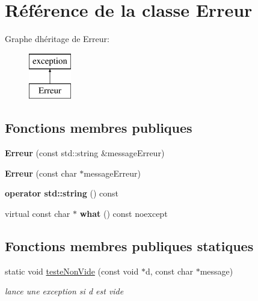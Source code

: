 \hypertarget{class_erreur}{}\section{Référence de la classe Erreur}
\label{class_erreur}
Graphe d\textquotesingle{}héritage de Erreur\+:\begin{figure}[H]
\begin{center}
\leavevmode
\includegraphics[height=2.000000cm]{class_erreur}
\end{center}
\end{figure}
\subsection*{Fonctions membres publiques}
\begin{DoxyCompactItemize}
\item 
\mbox{\label{class_erreur_a73d8d3c713bc18afd6a38cf337dfbb40}} 
{\bfseries Erreur} (const std\+::string \&message\+Erreur)
\item 
\mbox{\label{class_erreur_a15bbbbc7e23e4ea5e6bdebe8e299e6be}} 
{\bfseries Erreur} (const char $\ast$message\+Erreur)
\item 
\mbox{\label{class_erreur_a3a6fad6fcd3013b877c8ee838445ebec}} 
{\bfseries operator std\+::string} () const
\item 
\mbox{\label{class_erreur_a6843f7a2b86078ec1318548903d15326}} 
virtual const char $\ast$ {\bfseries what} () const noexcept
\end{DoxyCompactItemize}
\subsection*{Fonctions membres publiques statiques}
\begin{DoxyCompactItemize}
\item 
\mbox{\label{class_erreur_ad318a27a06c5c1f68506eb00b9fe6beb}} 
static void \mbox{\hyperlink{class_erreur_ad318a27a06c5c1f68506eb00b9fe6beb}{teste\+Non\+Vide}} (const void $\ast$d, const char $\ast$message)
\begin{DoxyCompactList}\small\item\em lance une exception si d est vide \end{DoxyCompactList}\end{DoxyCompactItemize}
